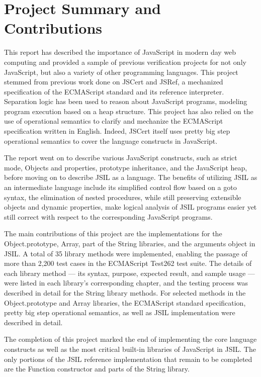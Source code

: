 \documentclass[a4paper,11pt,twoside]{report}
\begin{document}
\section{Project Summary and Contributions}
This report has described the importance of JavaScript in modern day web computing and provided a sample of previous verification projects for not only JavaScript, but also a variety of other programming languages. This project stemmed from previous work done on JSCert and JSRef, a mechanized specification of the ECMAScript standard and its reference interpreter. Separation logic has been used to reason about JavaScript programs, modeling program execution based on a heap structure. This project has also relied on the use of operational semantics to clarify and mechanize the ECMAScript specification written in English. Indeed, JSCert itself uses pretty big step operational semantics to cover the language constructs in JavaScript. 

The report went on to describe various JavaScript constructs, such as strict mode, Objects and properties, prototype inheritance, and the JavaScript heap, before moving on to describe JSIL as a language. The benefits of utilizing JSIL as an intermediate language include its simplified control flow based on a goto syntax, the elimination of nested procedures, while still preserving extensible objects and dynamic properties, make logical analysis of JSIL programs easier yet still correct with respect to the corresponding JavaScript programs.

The main contributions of this project are the implementations for the Object.prototype, Array, part of the String libraries, and the arguments object in JSIL. A total of 35 library methods were implemented, enabling the passage of more than 2,200 test cases in the ECMAScript Test262 test suite. The details of each library method --- its syntax, purpose, expected result, and sample usage --- were listed in each library's corresponding chapter, and the testing process was described in detail for the String library methods. For selected methods in the Object.prototype and Array libraries, the ECMAScript standard specification, pretty big step operational semantics, as well as JSIL implementation were described in detail.

The completion of this project marked the end of implementing the core language constructs as well as the most critical built-in libraries of JavaScript in JSIL. The only portions of the JSIL reference implementation that remain to be completed are the Function constructor and parts of the String library.
\end{document}
